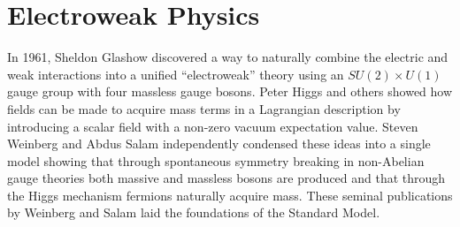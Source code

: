 \section{Electroweak Physics}
In 1961, Sheldon Glashow discovered a way to naturally combine the electric and weak interactions into a unified ``electroweak'' theory using an $SU(2)\times U(1)$ gauge group with four massless gauge bosons. Peter Higgs and others showed how fields can be made to acquire mass terms in a Lagrangian description by introducing a scalar field with a non-zero vacuum expectation value. Steven Weinberg and Abdus Salam independently condensed these ideas into a single model showing that through spontaneous symmetry breaking in non-Abelian gauge theories both massive and massless bosons are produced and that through the Higgs mechanism fermions naturally acquire mass. These seminal publications by Weinberg and Salam laid the foundations of the Standard Model\cite{Weinberg}\cite{Salam}.

